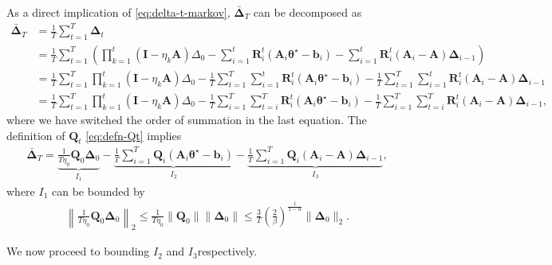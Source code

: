 As a direct implication of \eqref{eq:delta-t-markov}, $\bar{\bm{\Delta}}_T$ can be decomposed as 
\begin{align*}
\bar{\bm{\Delta}}_T &= \frac{1}{T}\sum_{t=1}^T \bm{\Delta}_t \\ 
 &= \frac{1}{T}\sum_{t=1}^T \left(\prod_{k=1}^t (\bm{I}-\eta_k \bm{A})\Delta_0 - \sum_{i=1}^{t} \bm{R}_{i}^t (\bm{A}_i\bm{\theta}^\star -\bm{b}_i) - \sum_{i=1}^{t} \bm{R}_{i}^t (\bm{A}_i - \bm{A})\bm{\Delta}_{i-1}\right) \\ 
&= \frac{1}{T}\sum_{t=1}^T\prod_{k=1}^t (\bm{I}-\eta_k \bm{A})\Delta_0 - \frac{1}{T}\sum_{t=1}^T\sum_{i=1}^{t} \bm{R}_{i}^t (\bm{A}_i\bm{\theta}^\star -\bm{b}_i) - \frac{1}{T}\sum_{t=1}^T\sum_{i=1}^{t}\bm{R}_{i}^t (\bm{A}_i - \bm{A})\bm{\Delta}_{i-1} \\ 
&= \frac{1}{T}\sum_{t=1}^T\prod_{k=1}^t (\bm{I}-\eta_k \bm{A})\Delta_0 - \frac{1}{T} \sum_{i=1}^T \sum_{t=i}^T \bm{R}_{i}^t (\bm{A}_i\bm{\theta}^\star -\bm{b}_i) - \frac{1}{T} \sum_{i=1}^T \sum_{t=i}^T \bm{R}_{i}^t (\bm{A}_i - \bm{A})\bm{\Delta}_{i-1},
\end{align*}
where we have switched the order of summation in the last equation. The definition of $\bm{Q}_t$ \eqref{eq:defn-Qt} implies 
\begin{align*}
\bar{\bm{\Delta}}_T = \underset{I_1}{\underbrace{\frac{1}{T\eta_0} \bm{Q}_0 \bm{\Delta}_0}} - \underset{I_2}{\underbrace{\frac{1}{T} \sum_{i=1}^T \bm{Q}_i(\bm{A}_i \bm{\theta}^\star-\bm{b}_i)}} - \underset{I_3}{\underbrace{\frac{1}{T}\sum_{i=1}^T \bm{Q}_i (\bm{A}_i-\bm{A})\bm{\Delta}_{i-1}}},
\end{align*}
where $I_1$ can be bounded by
\begin{align*}
\left\|\frac{1}{T\eta_0} \bm{Q}_0 \bm{\Delta}_0\right\|_2 \leq \frac{1}{T\eta_0} \|\bm{Q}_0\| \|\bm{\Delta}_0\|\leq \frac{3}{T}\left(\frac{2}{\beta}\right)^{\frac{1}{1-\alpha}} \|\bm{\Delta}_0\|_2. 
\end{align*}


We now proceed to bounding $I_2$ and $I_3$respectively. 

